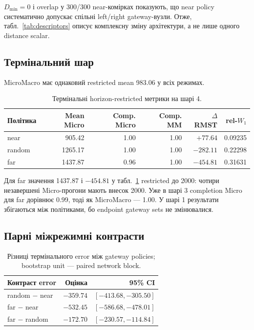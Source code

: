 \documentclass[11pt,a4paper]{article}
\begin{document}
$D_{\min}=0$ і overlap у 300/300 near-комірках показують, що near policy
систематично допускає спільні left/right gateway-вузли. Отже, табл.~\ref{tab:descriptors}
описує комплексну зміну архітектури, а не лише одного distance scalar.

\subsection{Термінальний шар}

MicroMacro має однаковий restricted mean 983.06 у всіх режимах.

\begin{table}[H]
\centering
\small
\caption{Термінальні horizon-restricted метрики на шарі 4.}
\label{tab:terminal}
\begin{tabular}{lrrrrr}
\toprule
Політика & Mean Micro & Comp. Micro & Comp. MM & $\Delta$RMST & rel-$W_1$ \\
\midrule
near   & 905.42  & 1.00 & 1.00 & $+77.64$  & 0.09235 \\
random & 1265.17 & 1.00 & 1.00 & $-282.11$ & 0.22298 \\
far    & 1437.87 & 0.96 & 1.00 & $-454.81$ & 0.31631 \\
\bottomrule
\end{tabular}
\end{table}

Для far значення 1437.87 і $-454.81$ у табл.~\ref{tab:terminal} restricted
до 2000: чотири незавершені Micro-прогони мають внесок 2000. Уже в шарі 3
completion Micro для far дорівнює 0.99, тоді як MicroMacro --- 1.00. У шарі 1
результати збігаються між політиками, бо endpoint gateway sets не змінювалися.

\subsection{Парні міжрежимні контрасти}

\begin{table}[H]
\centering
\caption{Різниці термінального error між gateway policies; bootstrap unit ---
paired network block.}
\label{tab:contrasts}
\begin{tabular}{lrr}
\toprule
Контраст error & Оцінка & 95\% CI \\
\midrule
random $-$ near & $-359.74$ & $[-413.68,-305.50]$ \\
far $-$ near    & $-532.45$ & $[-586.68,-478.01]$ \\
far $-$ random  & $-172.70$ & $[-230.57,-114.84]$ \\
\bottomrule
\end{tabular}
\end{table}
\end{document}

